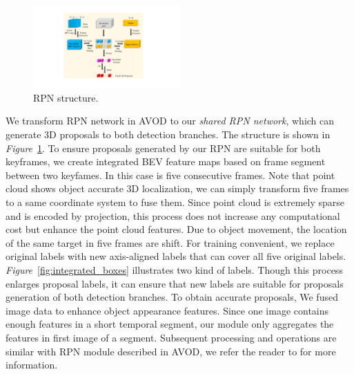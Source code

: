 \documentclass[letterpaper, 10 pt, conference]{ieeeconf}  %
\def\figurename{\emph{Figure}}
\begin{document}
\begin{figure}
	\vspace{-0.6cm}
	\rule{0pt}{1ex}
	\begin{center}
		\includegraphics[trim={6.5cm, 2cm, 6.5cm, 2cm}, clip,width=0.5\textwidth]{images/rpn.pdf}
	\end{center}
	\caption{RPN structure.}
	\label{fig:rpn}
	\vspace{-0.5cm}
\end{figure}

We transform RPN network in AVOD \cite{ku2018joint} to our \textit{shared RPN network}, which can generate 3D proposals to both detection branches. The structure is shown in \figurename \, \ref{fig:rpn}. To ensure proposals generated by our RPN are suitable for both keyframes, we create integrated BEV feature maps based on frame segment between two keyfames. In this case is five consecutive frames. Note that point cloud shows object accurate 3D localization, we can simply transform five frames to a same coordinate system to fuse them. Since point cloud is extremely sparse and is encoded by projection, this process does not increase any computational cost but enhance the point cloud features. Due to object movement, the location of the same target in five frames are shift. For training convenient, we replace original labels with new axis-aligned labels that can cover all five original labels. \figurename \, \ref{fig:integrated_boxes} illustrates two kind of labels. Though this process enlarges proposal labels, it can ensure that new labels are suitable for proposals generation of both detection branches. To obtain accurate proposals, We fused image data to enhance object appearance features. Since one image contains enough features in a short temporal segment, our module only aggregates the features in first image of a segment. Subsequent processing and operations are similar with RPN module described in AVOD, we refer the reader to \cite{ku2018joint} for more information.
\end{document}
